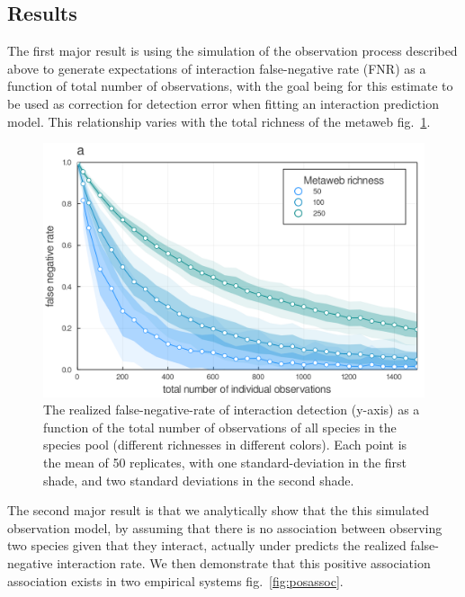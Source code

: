 \documentclass[10pt,oneside]{article}
\makeatletter
\def\maxwidth{\ifdim\Gin@nat@width>\linewidth\linewidth
\else\Gin@nat@width\fi}
\let\Oldincludegraphics\includegraphics
\renewcommand{\includegraphics}[1]{\Oldincludegraphics[width=\maxwidth]{#1}}
\makeatother
\begin{document}
\hypertarget{results}{%
\subsection{Results}\label{results}}

The first major result is using the simulation of the observation
process described above to generate expectations of interaction
false-negative rate (FNR) as a function of total number of observations,
with the goal being for this estimate to be used as correction for
detection error when fitting an interaction prediction model. This
relationship varies with the total richness of the metaweb
fig.~\ref{fig:fnr}.

\begin{figure}
\hypertarget{fig:fnr}{%
\centering
\includegraphics{./figures/ch2_fnr.png}
\caption{The realized false-negative-rate of interaction detection
(y-axis) as a function of the total number of observations of all
species in the species pool (different richnesses in different colors).
Each point is the mean of 50 replicates, with one standard-deviation in
the first shade, and two standard deviations in the second
shade.}\label{fig:fnr}
}
\end{figure}

The second major result is that we analytically show that the this
simulated observation model, by assuming that there is no association
between observing two species given that they interact, actually under
predicts the realized false-negative interaction rate. We then
demonstrate that this positive association association exists in two
empirical systems fig.~\ref{fig:posassoc}.
\end{document}
